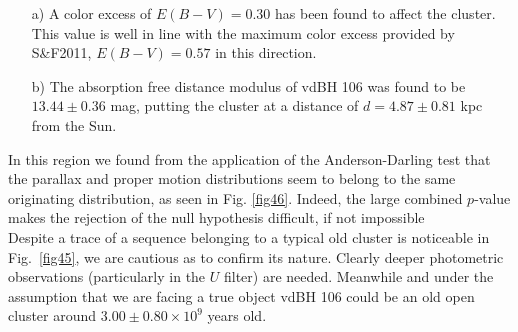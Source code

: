 \documentclass[draft]{aa}
\begin{document}
\begin{itemize}
\item [a)] A color excess of $E(B-V)=0.30$ has been found to affect the
cluster. This value is well in line with the maximum color excess provided
by S\&F2011, $E(B-V)=0.57$ in this direction.
\item [b)] The absorption free distance modulus of vdBH 106 was found to be
$13.44\pm0.36$ mag, putting the cluster at a distance of
$d=4.87\pm0.81$ kpc from the Sun.
\end{itemize}

In this region we found from the application of the Anderson-Darling test that
the parallax and proper motion distributions seem to belong to the same
originating distribution, as seen in Fig. \ref{fig46}. Indeed, the
large combined $p$-value makes the rejection of the null hypothesis difficult,
if not impossible\\

Despite a trace of a sequence belonging to a typical old cluster is
noticeable in Fig.~\ref{fig45}, we are cautious as to confirm its nature.
Clearly deeper photometric observations (particularly in the $U$ filter) are
needed. Meanwhile and under the assumption that we are facing a true object
vdBH 106 could be an old open cluster around $3.00\pm0.80\times10^9$ years
old.
\end{document}
